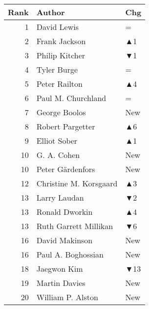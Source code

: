 \documentclass[
  10pt,
  letterpaper,
  DIV=11,
  numbers=noendperiod,
  twoside]{scrartcl}
\begin{document}
\begin{table}
\begin{minipage}{0.20\linewidth}
{\begin{tabular}{rll}
\toprule
Rank & Author & Chg\\
\midrule
1 & David Lewis & =\\
2 & Frank Jackson & \textcolor[RGB]{34,178,34}{▲1}\\
3 & Philip Kitcher & \textcolor[RGB]{178,34,34}{▼1}\\
4 & Tyler Burge & =\\
5 & Peter Railton & \textcolor[RGB]{34,178,34}{▲4}\\
6 & Paul M. Churchland & =\\
7 & George Boolos & \textcolor[RGB]{34,178,34}{New}\\
8 & Robert Pargetter & \textcolor[RGB]{34,178,34}{▲6}\\
9 & Elliot Sober & \textcolor[RGB]{34,178,34}{▲1}\\
10 & G. A. Cohen & \textcolor[RGB]{34,178,34}{New}\\
10 & Peter Gärdenfors & \textcolor[RGB]{34,178,34}{New}\\
12 & Christine M. Korsgaard & \textcolor[RGB]{34,178,34}{▲3}\\
13 & Larry Laudan & \textcolor[RGB]{178,34,34}{▼2}\\
13 & Ronald Dworkin & \textcolor[RGB]{34,178,34}{▲4}\\
13 & Ruth Garrett Millikan & \textcolor[RGB]{178,34,34}{▼6}\\
16 & David Makinson & \textcolor[RGB]{34,178,34}{New}\\
16 & Paul A. Boghossian & \textcolor[RGB]{34,178,34}{New}\\
18 & Jaegwon Kim & \textcolor[RGB]{178,34,34}{▼13}\\
19 & Martin Davies & \textcolor[RGB]{34,178,34}{New}\\
20 & William P. Alston & \textcolor[RGB]{34,178,34}{New}\\
\bottomrule
\end{tabular}

}

\end{minipage}%
%
\begin{minipage}{0.20\linewidth}


\centering{

}
\end{minipage}
\end{table}
\end{document}
